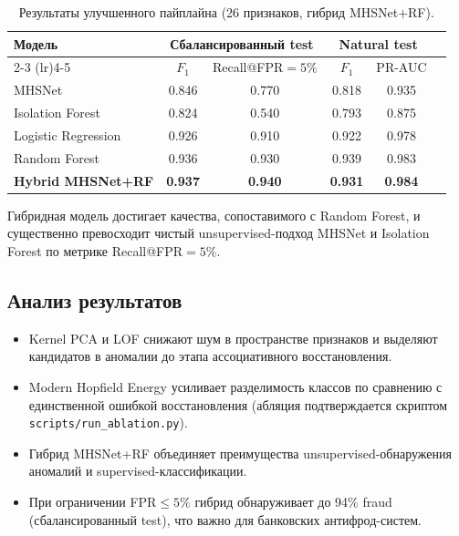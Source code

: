 \documentclass[12pt,a4paper]{article}
\begin{document}
\begin{table}[ht]
  \centering
  \caption{Результаты улучшенного пайплайна (26 признаков, гибрид MHSNet+RF).}
  \label{tab:hybrid}
  \begin{tabular}{lccccc}
    \toprule
    \multirow{2}{*}{Модель} & \multicolumn{2}{c}{Сбалансированный test} & \multicolumn{2}{c}{Natural test} \\
    \cmidrule(lr){2-3} \cmidrule(lr){4-5}
    & $F_1$ & Recall@FPR$=5\%$ & $F_1$ & PR-AUC \\
    \midrule
    MHSNet               & 0.846 & 0.770 & 0.818 & 0.935 \\
    Isolation Forest     & 0.824 & 0.540 & 0.793 & 0.875 \\
    Logistic Regression  & 0.926 & 0.910 & 0.922 & 0.978 \\
    Random Forest        & 0.936 & 0.930 & 0.939 & 0.983 \\
    \textbf{Hybrid MHSNet+RF} & \textbf{0.937} & \textbf{0.940} & \textbf{0.931} & \textbf{0.984} \\
    \bottomrule
  \end{tabular}
\end{table}

Гибридная модель достигает качества, сопоставимого с Random Forest,
и существенно превосходит чистый unsupervised-подход MHSNet и Isolation Forest
по метрике Recall@FPR$=5\%$.

\subsection{Анализ результатов}

\begin{itemize}
  \item Kernel PCA и LOF снижают шум в пространстве признаков и выделяют кандидатов в аномалии
        до этапа ассоциативного восстановления.
  \item Modern Hopfield Energy усиливает разделимость классов по сравнению с единственной
        ошибкой восстановления (абляция подтверждается скриптом \texttt{scripts/run\_ablation.py}).
  \item Гибрид MHSNet+RF объединяет преимущества unsupervised-обнаружения аномалий
        и supervised-классификации.
  \item При ограничении FPR$\le 5\%$ гибрид обнаруживает до 94\% fraud (сбалансированный test),
        что важно для банковских антифрод-систем.
\end{itemize}
\end{document}
